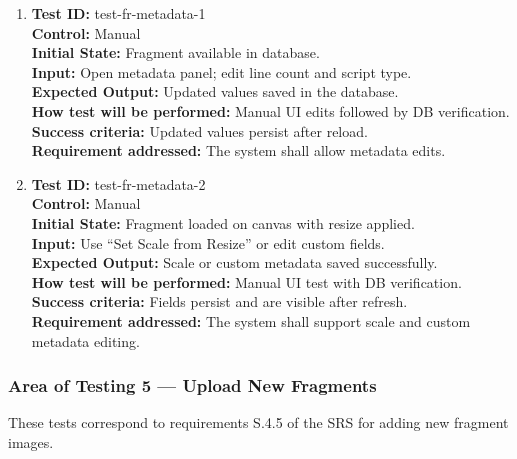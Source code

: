 \documentclass[12pt, titlepage]{article}
\begin{document}
\begin{enumerate}
    \item
    \textbf{Test ID:} test-fr-metadata-1\\
    \textbf{Control:} Manual\\
    \textbf{Initial State:} Fragment available in database.\\
    \textbf{Input:} Open metadata panel; edit line count and script type.\\
    \textbf{Expected Output:} Updated values saved in the database.\\
    \textbf{How test will be performed:} Manual UI edits followed by DB verification.\\
    \textbf{Success criteria:} Updated values persist after reload.\\
    \textbf{Requirement addressed:} The system shall allow metadata edits.\\

    \item
    \textbf{Test ID:} test-fr-metadata-2\\
    \textbf{Control:} Manual\\
    \textbf{Initial State:} Fragment loaded on canvas with resize applied.\\
    \textbf{Input:} Use ``Set Scale from Resize'' or edit custom fields.\\
    \textbf{Expected Output:} Scale or custom metadata saved successfully.\\
    \textbf{How test will be performed:} Manual UI test with DB verification.\\
    \textbf{Success criteria:} Fields persist and are visible after refresh.\\
    \textbf{Requirement addressed:} The system shall support scale and custom metadata editing.\\
\end{enumerate}

\subsubsection{Area of Testing 5 — Upload New Fragments}

These tests correspond to requirements S.4.5 of the SRS for adding new fragment images.
\end{document}
